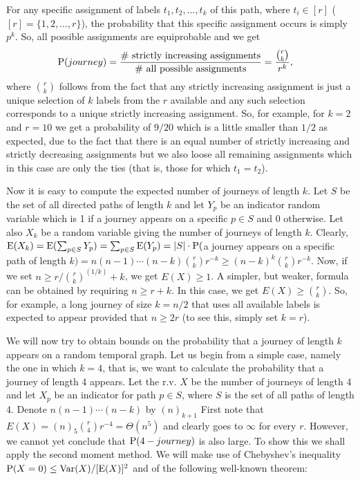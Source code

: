 \documentclass[oribibl, 11pt]{llncs}
\renewcommand{\P}{\textup{P}}
\newcommand{\E}{\textup{E}}
\newcommand{\Var}{\textup{Var}}
\begin{document}
For any specific assignment of labels $t_1,t_2,\ldots,t_k$ of this path, where $t_i\in [r]$ ($[r]=\{1,2,\ldots,r\}$), the probability that this specific assignment occurs is simply $p^k$. So, all possible assignments are equiprobable and we get
\begin{align*}
\P(journey)&=\frac{\# \text{ strictly increasing assignments}}{\# \text{ all possible assignments}}=\frac{\binom{r}{k}}{r^k},
\end{align*}  
where $\binom{r}{k}$ follows from the fact that any strictly increasing assignment is just a unique selection of $k$ labels from the $r$ available and any such selection corresponds to a unique strictly increasing assignment. So, for example, for $k=2$ and $r=10$ we get a probability of $9/20$ which is a little smaller than $1/2$ as expected, due to the fact that there is an equal number of strictly increasing and strictly decreasing assignments but we also loose all remaining assignments which in this case are only the ties (that is, those for which $t_1=t_2$).

Now it is easy to compute the expected number of journeys of length $k$. Let $S$ be the set of all directed paths of length $k$ and let $Y_p$ be an indicator random variable which is 1 if a journey appears on a specific $p\in S$ and 0 otherwise. Let also $X_k$ be a random variable giving the number of journeys of length $k$. Clearly, $\E(X_k)=\E(\sum_{p\in S} Y_p)=\sum_{p\in S} \E(Y_p)=|S|\cdot\P($a journey appears on a specific path of length $k)=n(n-1)\cdots(n-k)\binom{r}{k}r^{-k}\geq (n-k)^k\binom{r}{k}r^{-k}$. Now, if we set $n\geq r/\binom{r}{k}^{(1/k)}+k$, we get $E(X)\geq 1$. A simpler, but weaker, formula can be obtained by requiring $n\geq r+k$. In this case, we get $E(X)\geq \binom{r}{k}$. So, for example, a long journey of size $k=n/2$ that uses all available labels is expected to appear provided that $n\geq 2r$ (to see this, simply set $k=r$).

We will now try to obtain bounds on the probability that a journey of length $k$ appears on a random temporal graph. Let us begin from a simple case, namely the one in which $k=4$, that is, we want to calculate the probability that a journey of length 4 appears. Let the r.v. $X$ be the number of journeys of length 4 and let $X_p$ be an indicator for path $p\in S$, where $S$ is the set of all paths of length 4. Denote $n(n-1)\cdots(n-k)$ by $(n)_{k+1}$ First note that $E(X)=(n)_{5}\binom{r}{4}r^{-4}= \Theta(n^5)$ and clearly goes to $\infty$ for every $r$. However, we cannot yet conclude that $\P(4-journey)$ is also large. To show this we shall apply the second moment method. We will make use of Chebyshev's inequality $\P(X=0)\leq \Var(X)/[\E(X)]^2$ and of the following well-known theorem:
\end{document}

